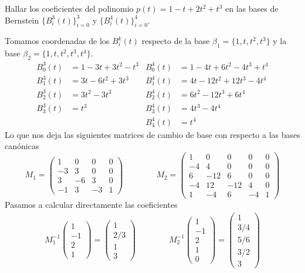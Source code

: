 \documentclass[twoside]{article}
\begin{document}
\begin{ejercicio}{3.1}
Hallar los coeficientes del polinomio $p(t)= 1-t+2t^2+t^3$ en las bases de Bernstein $\{B_i^3(t)\}_{i=0}^3$ y $\{B_i^4(t)\}_{i=0}^4$.
\end{ejercicio}
\begin{solucion}
Tomamos coordenadas de los $B_i^k(t)$ respecto de la base $\beta_1 =\{1,t,t^2,t^3\}$ y la base $\beta_2 = \{1,t,t^2,t^3,t^4\}$.
\begin{align*}
B_0^3(t) &= 1 - 3t +3t^2 -t^3 & B_0^4(t) &= 1 -4t+6t^2-4t^3+t^4\\
B_1^3(t) & = 3t-6t^2+3t^3 & B_1^4(t) &= 4t-12t^2+12t^3-4t^4\\
B_2^3(t) &= 3t^2 -3t^3 & B_2^4(t) &= 6t^2-12t^3+6t^4\\
B_3^3(t) &= t^3 & B_3^4(t) &=4t^3-4t^4\\
 & & B_4^4(t) &= t^4
\end{align*}
Lo que nos deja las siguientes matrices de cambio de base con respecto a las bases canónicas
$$
M_1 = 
\begin{pmatrix}
1 & 0 & 0 & 0\\
-3 & 3 & 0 &0\\
3 & -6 & 3 & 0\\
-1 & 3 & -3 & 1
\end{pmatrix} \qquad \qquad  M_2 = 
\begin{pmatrix}
1  & 0   & 0   & 0  & 0\\
-4 & 4   & 0   & 0  & 0\\
6  & -12 & 6   & 0  & 0\\
-4 & 12  & -12 & 4  & 0\\
1  & -4  & 6   & -4 & 1
\end{pmatrix}
$$ 
Pasamos a calcular directamente las coeficientes
\begin{gather*}
M_1^{-1}\begin{pmatrix}
1\\
-1\\
2\\
1
\end{pmatrix}
= 
\begin{pmatrix}
1\\
2/3\\
1\\
3
\end{pmatrix} \qquad \qquad M_2^{-1}  \begin{pmatrix}
1\\
-1\\
2\\
1\\
0
\end{pmatrix} = 
 \begin{pmatrix}
1\\
3/4\\
5/6\\
3/2\\
3
\end{pmatrix} 
\end{gather*}
\end{solucion}
\end{document}
